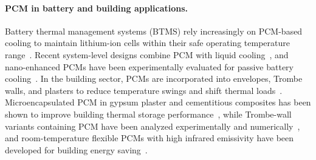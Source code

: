 \paragraph{PCM in battery and building applications.}
Battery thermal management systems (BTMS) rely increasingly on PCM-based cooling to maintain lithium-ion cells within their safe operating temperature range~\cite{jiang2024battery,lebrouhi2024comparative}. Recent system-level designs combine PCM with liquid cooling~\cite{keyhani2025innovative,pakrouh2023thermal,masthanvali2024battery,wu2026numerical,kumar2025battery}, and nano-enhanced PCMs have been experimentally evaluated for passive battery cooling~\cite{hadawale2025passive}. In the building sector, PCMs are incorporated into envelopes, Trombe walls, and plasters to reduce temperature swings and shift thermal loads~\cite{alyasiri2022energetic,muthuvel2014passive}. Microencapsulated PCM in gypsum plaster and cementitious composites has been shown to improve building thermal storage performance~\cite{wi2021exterior,enteshari2022fabrication,hekimoglu2021thermal}, while Trombe-wall variants containing PCM have been analyzed experimentally and numerically~\cite{zhou2023effect,krason2025thermal,tareemi2026advances}, and room-temperature flexible PCMs with high infrared emissivity have been developed for building energy saving~\cite{kong2024room}.


